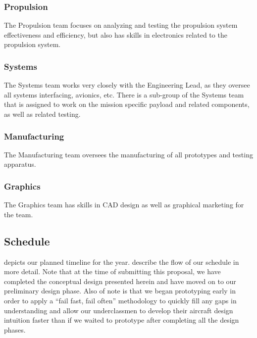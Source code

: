 \documentclass[proposal]{byu-aero}
\begin{document}
\subsubsection{Propulsion} The Propulsion team focuses on analyzing and testing the propulsion system effectiveness and efficiency, but also has skills in electronics related to the propulsion system.
\subsubsection{Systems} The Systems team works very closely with the Engineering Lead, as they oversee all systems interfacing, avionics, etc.  There is a sub-group of the Systems team that is assigned to work on the mission specific payload and related components, as well as related testing. %
\subsubsection{Manufacturing} The Manufacturing team oversees the manufacturing of all prototypes and testing apparatus.
\subsubsection{Graphics} The Graphics team has skills in CAD design as well as graphical marketing for the team. 




\subsection{Schedule}
\label{ssec:Schedule}

 depicts our planned timeline for the year.  describe the flow of our schedule in more detail. Note that at the time of submitting this proposal, we have completed the conceptual design presented herein and have moved on to our preliminary design phase. Also of note is that we began prototyping early in order to apply a ``fail fast, fail often'' methodology to quickly fill any gaps in understanding and allow our underclassmen to develop their aircraft design intuition faster than if we waited to prototype after completing all the design phases.

\end{document}
